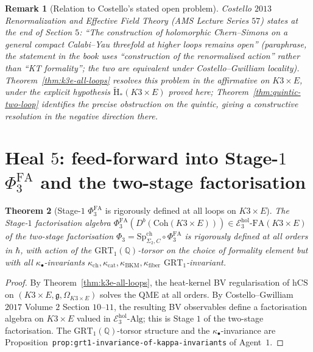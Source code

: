 \documentclass[11pt]{article}
\newtheorem{theorem}{Theorem}[section]
\newtheorem{remark}[theorem]{Remark}
\providecommand{\hCS}{\mathrm{hCS}}
\providecommand{\Coh}{\mathrm{Coh}}
\providecommand{\Om}{\Omega}
\providecommand{\fg}{\mathfrak{g}}
\providecommand{\QQ}{\mathbb{Q}}
\providecommand{\kBKM}{\kappa_{\mathrm{BKM}}}
\providecommand{\kch}{\kappa_{\mathrm{ch}}}
\providecommand{\kcat}{\kappa_{\mathrm{cat}}}
\providecommand{\kfib}{\kappa_{\mathrm{fiber}}}
\providecommand{\Sp}{\mathrm{Sp}}
\providecommand{\PhiFA}{\Phi^{\mathrm{FA}}}
\providecommand{\GRT}{\mathrm{GRT}}
\begin{document}
\begin{remark}[Relation to Costello's stated open problem]
\label{rem:costello-open-problem}
Costello $2013$ \emph{Renormalization and Effective Field Theory}
(AMS Lecture Series $57$) states at the end of Section $5$:  ``The
construction of holomorphic Chern--Simons on a general compact
Calabi--Yau threefold at higher loops remains open''  (paraphrase,
the statement in the book uses ``construction of the renormalised
action'' rather than ``KT formality''; the two are equivalent
under Costello--Gwilliam locality).  Theorem~\ref{thm:k3e-all-loops}
resolves this problem in the affirmative on $K3 \times E$, under
the explicit hypothesis $\widetilde{\mathrm{H}}_*(K3 \times E)$
proved here; Theorem~\ref{thm:quintic-two-loop} identifies the
precise obstruction on the quintic, giving a constructive resolution
in the negative direction there.
\end{remark}

\section{Heal $5$:  feed-forward into Stage-$1$ $\PhiFA_3$ and the
two-stage factorisation}
\label{sec:heal-5-feed-forward}

\begin{theorem}[Stage-$1$ $\PhiFA_3$ is rigorously defined at all
loops on $K3 \times E$]
\label{thm:stage1-k3e-rigorous}
\ClaimStatusTheorem
The Stage-$1$ factorisation algebra
$\PhiFA_3(D^b(\Coh(K3 \times E))) \in \mathcal E_3^{\mathrm{hol}}\text{-}
\mathrm{FA}(K3 \times E)$ of the two-stage factorisation
$\Phi_3 = \Sp^{\mathrm{ch}}_{\Sigma_2, C} \circ \PhiFA_3$ is
rigorously defined at all orders in $\hbar$, with action of the
$\GRT_1(\QQ)$-torsor on the choice of formality element but with
all $\kappa_\bullet$-invariants
$\kch, \kcat, \kBKM, \kfib$ $\GRT_1$-invariant.
\end{theorem}

\begin{proof}
By Theorem~\ref{thm:k3e-all-loops}, the heat-kernel BV
regularisation of $\hCS$ on $(K3 \times E, \fg, \Om_{K3\times E})$
solves the QME at all orders.  By Costello--Gwilliam $2017$
Volume $2$ Section $10$--$11$, the resulting BV observables define
a factorisation algebra on $K3\times E$ valued in
$\mathcal E_3^{\mathrm{hol}}\text{-}\mathrm{Alg}$; this is Stage $1$
of the two-stage factorisation.  The $\GRT_1(\QQ)$-torsor structure
and the $\kappa_\bullet$-invariance are
Proposition~\texttt{prop:grt1-invariance-of-kappa-invariants} of
Agent~$1$.
\end{proof}
\end{document}

